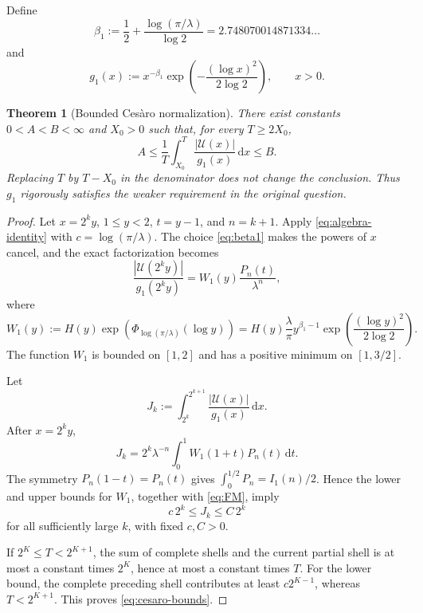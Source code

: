 \documentclass[11pt,oneside]{article}
\newtheorem{theorem}{Theorem}[section]
\theoremstyle{definition}
\theoremstyle{remark}
\newcommand{\dd}{\,\mathrm d}
\newcommand{\Uhat}{\mathcal U}
\begin{document}
Define
\begin{equation}\label{eq:beta1}
 \beta_1:=\frac12+\frac{\log(\pi/\lambda)}{\log2}
 =2.748070014871334\ldots
\end{equation}
and
\begin{equation}\label{eq:g1}
 g_1(x):=x^{-\beta_1}
 \exp\!\left(-\frac{(\log x)^2}{2\log2}\right),\qquad x>0.
\end{equation}

\begin{theorem}[Bounded Ces\`aro normalization]\label{thm:cesaro-bounded}
There exist constants $0<A<B<\infty$ and $X_0>0$ such that, for every $T\ge2X_0$,
\begin{equation}\label{eq:cesaro-bounds}
 A\le\frac1T\int_{X_0}^{T}
 \frac{|\Uhat(x)|}{g_1(x)}\dd x\le B.
\end{equation}
Replacing $T$ by $T-X_0$ in the denominator does not change the conclusion.  Thus
$g_1$ rigorously satisfies the weaker requirement in the original question.
\end{theorem}

\begin{proof}
Let $x=2^ky$, $1\le y<2$, $t=y-1$, and $n=k+1$.  Apply
\eqref{eq:algebra-identity} with
$c=\log(\pi/\lambda)$.  The choice \eqref{eq:beta1} makes the powers of $x$ cancel,
and the exact factorization becomes
\begin{equation}\label{eq:ratio-exact-L1}
 \frac{|\Uhat(2^ky)|}{g_1(2^ky)}
 =W_1(y)\frac{P_n(t)}{\lambda^n},
\end{equation}
where
\begin{equation}\label{eq:W1}
 W_1(y):=H(y)
 \exp\!\left(\Phi_{\log(\pi/\lambda)}(\log y)\right)
 =H(y)\frac{\lambda}{\pi}
 y^{\beta_1-1}
 \exp\!\left(\frac{(\log y)^2}{2\log2}\right).
\end{equation}
The function $W_1$ is bounded on $[1,2]$ and has a positive minimum on
$[1,3/2]$.

Let
\[
 J_k:=\int_{2^k}^{2^{k+1}}
 \frac{|\Uhat(x)|}{g_1(x)}\dd x.
\]
After $x=2^ky$,
\begin{equation}\label{eq:Jk}
 J_k=2^k\lambda^{-n}
 \int_0^1W_1(1+t)P_n(t)\dd t.
\end{equation}
The symmetry $P_n(1-t)=P_n(t)$ gives
$\int_0^{1/2}P_n=I_1(n)/2$.  Hence the lower and upper bounds for $W_1$, together
with \eqref{eq:FM}, imply
\begin{equation}\label{eq:Jk-asymp-bounds}
 c\,2^k\le J_k\le C\,2^k
\end{equation}
for all sufficiently large $k$, with fixed $c,C>0$.

If $2^K\le T<2^{K+1}$, the sum of complete shells and the current partial shell is at
most a constant times $2^K$, hence at most a constant times $T$.  For the lower bound,
the complete preceding shell contributes at least $c2^{K-1}$, whereas
$T<2^{K+1}$.  This proves \eqref{eq:cesaro-bounds}.
\end{proof}
\end{document}
